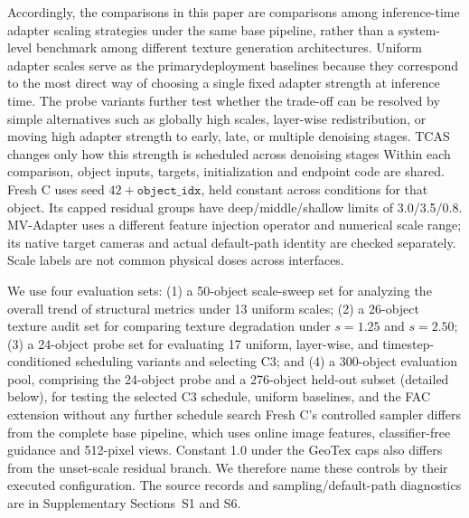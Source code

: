 \documentclass[times,twocolumn,final]{elsarticle}
\providecommand{\DIFadd}[1]{{\protect\color{blue} \sf #1}} %
\providecommand{\DIFdel}[1]{{\protect\color{red} \scriptsize #1}} %
\providecommand{\DIFaddbegin}{} %
\providecommand{\DIFaddend}{} %
\providecommand{\DIFdelbegin}{} %
\providecommand{\DIFdelend}{} %
\begin{document}
\DIFdelbegin \DIFdel{Accordingly, the comparisons in this paper are comparisons among inference-time adapter scaling strategies under the same base pipeline, rather than a system-level benchmark among different texture generation architectures. Uniform adapter scales serve as the primarydeployment baselines because they correspond to the most direct way of choosing a single fixed adapter strength at inference time. The probe variants further test whether the trade-off can be resolved by simple alternatives such as globally high scales, layer-wise redistribution, or moving high adapter strength to early, late, or multiple denoising stages. TCAS changes only how this strength is scheduled across denoising stages}\DIFdelend \DIFaddbegin \DIFadd{Within each comparison, object inputs, targets, initialization and endpoint code are shared. Fresh C uses seed $42+\texttt{object\_idx}$, held constant across conditions for that object. Its capped residual groups have deep/middle/shallow limits of 3.0/3.5/0.8}\DIFaddend . \DIFaddbegin \DIFadd{MV-Adapter uses a different feature injection operator and numerical scale range; its native target cameras and actual default-path identity are checked separately. Scale labels are not common physical doses across interfaces.
}\DIFaddend

\DIFdelbegin %

\DIFdel{We use four evaluation sets: (1) a 50-object scale-sweep set for analyzing the overall trend of structural metrics under 13 uniform scales; (2) a 26-object texture audit set for comparing texture degradation under $s = 1.25$ and $s = 2.50$; (3) a 24-object probe set for evaluating 17 uniform, layer-wise, and timestep-conditioned scheduling variants and selecting C3; and (4) a 300-object evaluation pool, comprising the 24-object probe and a 276-object held-out subset (detailed below), for testing the selected C3 schedule, uniform baselines, and the FAC extension without any further schedule search}\DIFdelend \DIFaddbegin \DIFadd{Fresh C's controlled sampler differs from the complete base pipeline, which uses online image features, classifier-free guidance and 512-pixel views. Constant 1.0 under the GeoTex caps also differs from the unset-scale residual branch. We therefore name these controls by their executed configuration. The source records and sampling/default-path diagnostics are in Supplementary Sections~S1 and S6}\DIFaddend .
\end{document}

